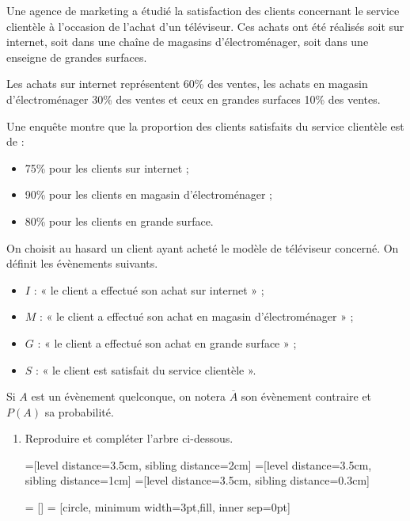\documentclass[11pt,fleqn, openany]{book} %
\begin{document}
\begin{exercise}[topic=lgn04, subtitle={(Métropole 2024, Jour 1)}]
Une agence de marketing a étudié la satisfaction des clients concernant le service clientèle à l'occasion de l'achat d'un téléviseur. Ces achats ont été réalisés soit sur internet, soit dans une chaîne de magasins d'électroménager, soit dans une enseigne de grandes surfaces.

Les achats sur internet représentent 60\% des ventes, les achats en magasin d'électroménager 30\% des ventes et ceux en grandes surfaces 10\% des ventes.

Une enquête montre que la proportion des clients satisfaits du service clientèle est de :
\begin{itemize}
\item 75\% pour les clients sur internet ;
\item 90\% pour les clients en magasin d'électroménager ;
\item 80\% pour les clients en grande surface.
\end{itemize}
On choisit au hasard un client ayant acheté le modèle de téléviseur concerné. On définit les évènements suivants.
\begin{itemize}
\item $I$ : « le client a effectué son achat sur internet » ;
\item $M$ : « le client a effectué son achat en magasin d'électroménager » ;
\item $G$ : « le client a effectué son achat en grande surface » ;
\item $S$ : « le client est satisfait du service clientèle ».
\end{itemize}

Si $A$ est un évènement quelconque, on notera $\overline{A}$ son évènement contraire et $P(A)$ sa probabilité.
\begin{enumerate}
\item Reproduire et compléter l'arbre ci-dessous.

=[level distance=3.5cm, sibling distance=2cm]
=[level distance=3.5cm, sibling distance=1cm]
=[level distance=3.5cm, sibling distance=0.3cm]

 = []
 = [circle, minimum width=3pt,fill, inner sep=0pt]


\end{enumerate}
\end{exercise}
\end{document}
